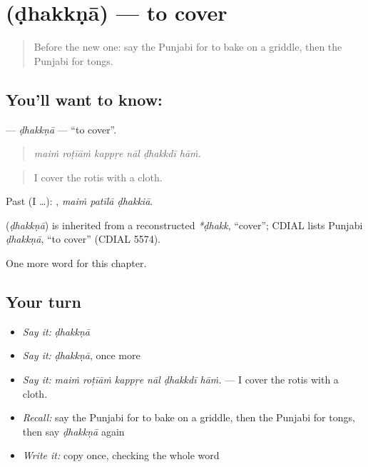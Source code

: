 \section[\texorpdfstring{\pa{ਢੱਕਣਾ} (ḍhakkṇā)}{ਢੱਕਣਾ (ḍhakkṇā)}]{ (ḍhakkṇā) — to cover}

\label{lesson:PA-C239-dhakkna}



\begin{quote}
Before the new one: say the Punjabi for to bake on a griddle, then the Punjabi for tongs.
\end{quote}

\subsection*{You'll want to know: }
\textbf{} — \emph{ḍhakkṇā} — \textquotedblleft{}to cover\textquotedblright{}.

\begin{quote}
     
\end{quote}

\begin{quote}
\emph{maiṁ roṭīāṁ kappṛe nāl ḍhakkdī hāṁ.}
\end{quote}

\begin{quote}
I cover the rotis with a cloth.
\end{quote}

Past (I …):   , \emph{maiṁ patīlā ḍhakkiā}.

\begin{cousinweb}
\textbf{} (\emph{ḍhakkṇā}) is inherited from a reconstructed \emph{*ḍhakk}, \textquotedblleft{}cover\textquotedblright{}; CDIAL lists Punjabi \emph{ḍhakkṇā}, \textquotedblleft{}to cover\textquotedblright{} (CDIAL 5574).
\end{cousinweb}

\begin{grammarlens}[title={What you've built}]
One more word for this chapter.
\end{grammarlens}

\subsection*{Your turn}
\begin{itemize}
\raggedright
  \item \emph{Say it:} \emph{ḍhakkṇā}
  \item \emph{Say it:} \emph{ḍhakkṇā}, once more
  \item \emph{Say it:} \emph{maiṁ roṭīāṁ kappṛe nāl ḍhakkdī hāṁ.} — I cover the rotis with a cloth.
  \item \emph{Recall:} say the Punjabi for to bake on a griddle, then the Punjabi for tongs, then say \emph{ḍhakkṇā} again
  \item \emph{Write it:} copy \textbf{} once, checking the whole word
\end{itemize}

